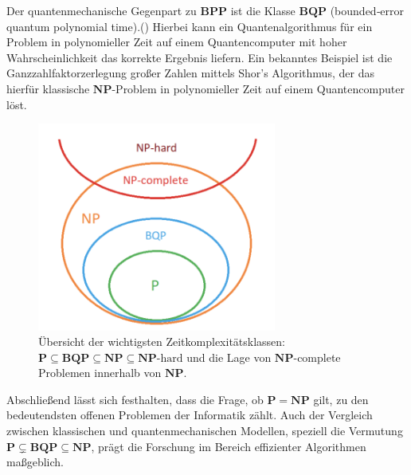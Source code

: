 Der quantenmechanische Gegenpart zu \(\mathbf{BPP}\) ist die Klasse \(\mathbf{BQP}\) (bounded‑error quantum polynomial time).(\cite{zotero-1212}) Hierbei kann ein Quantenalgorithmus für ein Problem in polynomieller Zeit auf einem Quantencomputer mit hoher Wahrscheinlichkeit das korrekte Ergebnis liefern. Ein bekanntes Beispiel ist die Ganzzahlfaktorzerlegung großer Zahlen mittels Shor’s Algorithmus, der das hierfür klassische \(\mathbf{NP}\)-Problem in polynomieller Zeit auf einem Quantencomputer löst.

\begin{figure}[h]
  \centering
  \includegraphics[width=0.7\textwidth]{images/basic-algorithms/problem-classes.png}
  \caption{Übersicht der wichtigsten Zeitkomplexitätsklassen: \(\mathbf{P}\subseteq \mathbf{BQP}\subseteq \mathbf{NP}\subseteq \mathbf{NP}\text{-hard}\) und die Lage von \(\mathbf{NP}\)-complete Problemen innerhalb von \(\mathbf{NP}\).}
  \label{fig:problem_classes}
\end{figure}

Abschließend lässt sich festhalten, dass die Frage, ob \(\mathbf{P}=\mathbf{NP}\) gilt, zu den bedeutendsten offenen Problemen der Informatik zählt. Auch der Vergleich zwischen klassischen und quantenmechanischen Modellen, speziell die Vermutung \(\mathbf{P}\subsetneq \mathbf{BQP}\subseteq \mathbf{NP}\), prägt die Forschung im Bereich effizienter Algorithmen maßgeblich.
\printbibliography